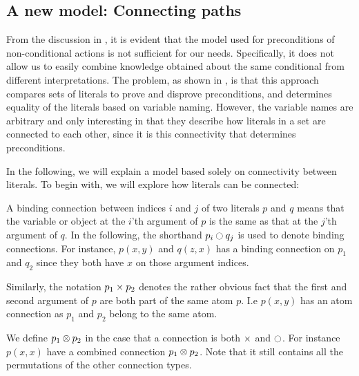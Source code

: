 \documentclass[\master/Master.tex]{subfiles}
\begin{document}
\subsection{A new model: Connecting paths}\label{ssec:ca:connecting-paths}
From the discussion in , 
it is evident that the model used for preconditions of non-conditional actions is not sufficient for our needs. 
Specifically, it does not allow us to easily combine knowledge obtained about the same conditional from different interpretations. 
The problem, as shown in , is that this approach compares sets of literals to prove and disprove preconditions, and determines equality of the literals based on variable naming. 
However, the variable names are arbitrary and only interesting in that they describe how literals in a set are connected to each other, since it is this connectivity that determines preconditions.

In the following, we will explain a model based solely on connectivity between literals. To begin with, we will explore how literals can be connected:

\begin{definition}\label{def:ca:bindingConn}
    A binding connection between indices $i$ and $j$ of two literals $p$ and $q$ means that the variable or object at the $i$'th argument of $p$ is the same as that at the $j$'th argument of $q$. In the following, the shorthand $p_i \ocircle q_j$ is used to denote binding connections.
    For instance, $p(x,y)$ and $q(z,x)$ has a binding connection on $p_1$ and $q_2$ since they both have $x$ on those argument indices.
    
\end{definition}

\begin{definition}\label{def:ca:predicateConn}
    Similarly, the notation $p_1 \times p_2$ denotes the rather obvious fact that the first and second argument of $p$ are both part of the same atom $p$. I.e $p(x,y)$ has an atom connection as $p_1$ and $p_2$ belong to the same atom.
\end{definition}

\begin{definition}\label{def:ca:combinedConn}
	We define $p_1 \otimes p_2$ in the case that a connection is both $\times$ and $\ocircle$.
	For instance $p(x,x)$ have a combined connection $p_1 \otimes p_2$. Note that it still contains all the permutations of the other connection types.
\end{definition}
\end{document}
